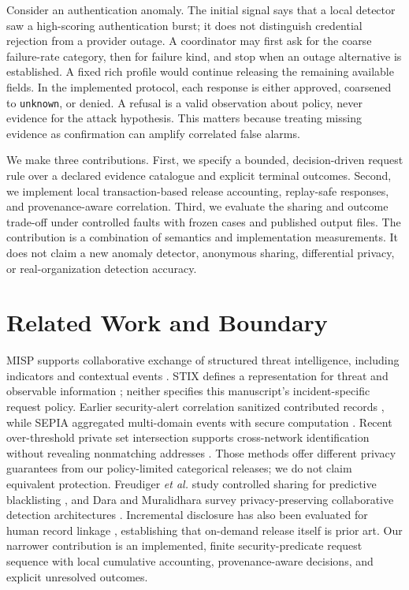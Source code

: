 \documentclass[conference,letterpaper]{IEEEtran}
\begin{document}
Consider an authentication anomaly. The initial signal says that a local detector saw a high-scoring authentication burst; it does not distinguish credential rejection from a provider outage. A coordinator may first ask for the coarse failure-rate category, then for failure kind, and stop when an outage alternative is established. A fixed rich profile would continue releasing the remaining available fields. In the implemented protocol, each response is either approved, coarsened to \texttt{unknown}, or denied. A refusal is a valid observation about policy, never evidence for the attack hypothesis. This matters because treating missing evidence as confirmation can amplify correlated false alarms.

We make three contributions. First, we specify a bounded, decision-driven request rule over a declared evidence catalogue and explicit terminal outcomes. Second, we implement local transaction-based release accounting, replay-safe responses, and provenance-aware correlation. Third, we evaluate the sharing and outcome trade-off under controlled faults with frozen cases and published output files. The contribution is a combination of semantics and implementation measurements. It does not claim a new anomaly detector, anonymous sharing, differential privacy, or real-organization detection accuracy.

\section{Related Work and Boundary}
MISP supports collaborative exchange of structured threat intelligence, including indicators and contextual events \cite{misp}. STIX defines a representation for threat and observable information \cite{stix}; neither specifies this manuscript's incident-specific request policy. Earlier security-alert correlation sanitized contributed records \cite{lincoln}, while SEPIA aggregated multi-domain events with secure computation \cite{sepia}. Recent over-threshold private set intersection supports cross-network identification without revealing nonmatching addresses \cite{psi}. Those methods offer different privacy guarantees from our policy-limited categorical releases; we do not claim equivalent protection. Freudiger \emph{et al.} study controlled sharing for predictive blacklisting \cite{freudiger}, and Dara and Muralidhara survey privacy-preserving collaborative detection architectures \cite{dara}. Incremental disclosure has also been evaluated for human record linkage \cite{kum}, establishing that on-demand release itself is prior art. Our narrower contribution is an implemented, finite security-predicate request sequence with local cumulative accounting, provenance-aware decisions, and explicit unresolved outcomes.
\end{document}
